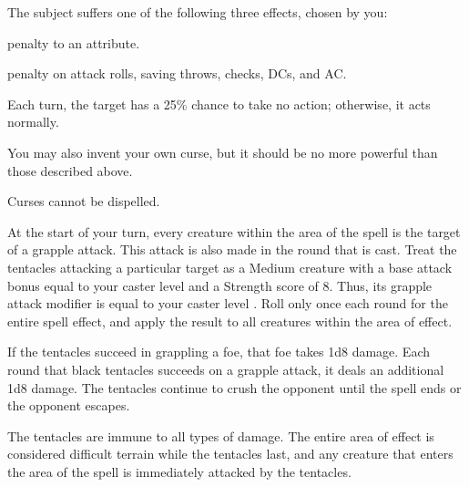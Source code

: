 \spellrng{\rngclose}
\begin{spelleffect}
  The subject suffers one of the following three effects, chosen by you:
  \begin{itemize*}
    \item {} penalty to an attribute.
    \item {} penalty on attack rolls, saving throws, checks, DCs, and AC.
    \item Each turn, the target has a 25\% chance to take no action; otherwise, it acts normally.
  \end{itemize*}
  \par You may also invent your own curse, but it should be no more powerful than those described above.
\end{spelleffect}
\begin{spellnotes}
  Curses cannot be dispelled.
\end{spellnotes}

\spellrng{\rngmed}
\begin{spelleffect}
  At the start of your turn, every creature within the area of the spell is the target of a grapple attack. This attack is also made in the round that  is cast. Treat the tentacles attacking a particular target as a Medium creature with a base attack bonus equal to your caster level and a Strength score of 8. Thus, its grapple attack modifier is equal to your caster level . Roll only once each round for the entire spell effect, and apply the result to all creatures within the area of effect.
  \par If the tentacles succeed in grappling a foe, that foe takes 1d8 damage. Each round that black tentacles succeeds on a grapple attack, it deals an additional 1d8 damage. The tentacles continue to crush the opponent until the spell ends or the opponent escapes.
  \par The tentacles are immune to all types of damage. The entire area of effect is considered difficult terrain while the tentacles last, and any creature that enters the area of the spell is immediately attacked by the tentacles.
\end{spelleffect}

